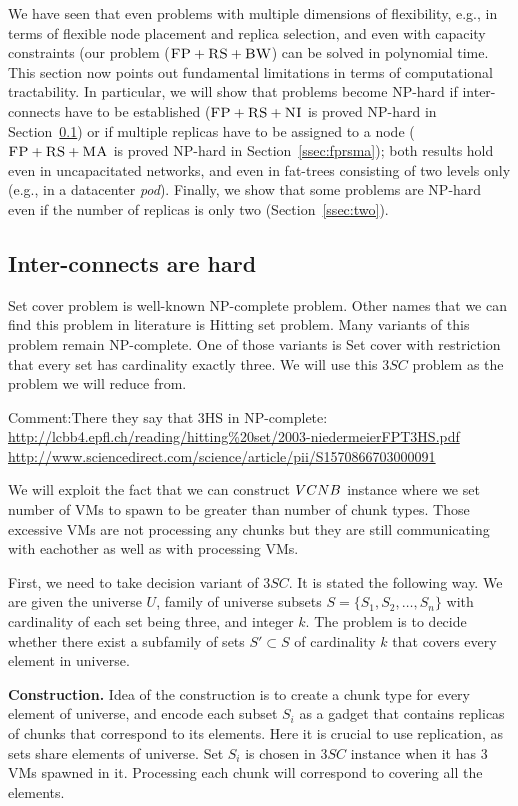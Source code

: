 We have seen that even problems with multiple dimensions of
flexibility, e.g., in terms of flexible node placement 
and replica selection, and even with capacity constraints (our problem
($\textsc{FP}+\textsc{RS}+\textsc{BW}$) can be solved in polynomial time.
This section now points out fundamental
limitations in terms of computational tractability. In particular,
we will show that problems become NP-hard if
inter-connects have to be established ($\textsc{FP}+\textsc{RS}+\textsc{NI}$ is proved
NP-hard in Section~\ref{ssec:fprscc}) or if multiple replicas
have to be assigned to a node ($\textsc{FP}+\textsc{RS}+\textsc{MA}$ is proved
NP-hard in Section~\ref{ssec:fprsma}); both results hold
even in uncapacitated networks, and even in fat-trees consisting
of two levels only (e.g., in a datacenter \emph{pod}). Finally, we show that
some problems are NP-hard even if the number of replicas is only two
(Section~\ref{ssec:two}).


\subsection{Inter-connects are hard}\label{ssec:fprscc}

Set cover problem is well-known NP-complete problem. Other names that
we can find this problem in literature is Hitting set problem. Many variants of
this problem remain NP-complete. One of those variants is Set cover
with restriction that every set has cardinality exactly three. We will
use this $3SC$ problem as the problem we will reduce from.

Comment:There they say that 3HS in NP-complete:
\url{http://lcbb4.epfl.ch/reading/hitting\%20set/2003-niedermeierFPT3HS.pdf}
\url{http://www.sciencedirect.com/science/article/pii/S1570866703000091}

We will exploit the fact that we can construct $VCNB$ instance where
we set number of VMs to spawn to be greater than number of chunk
types. Those excessive VMs are not processing any chunks but they are
still communicating with eachother as well as with processing
VMs.

First, we need to take decision variant of $3SC$. It is stated the
following way. We are given the universe $U$, family of universe
subsets $S = \{ S_1, S_2, \ldots, S_n \}$ with cardinality of each set
being three, and integer $k$. The problem is to decide whether there
exist a subfamily of sets $S' \subset S$ of cardinality $k$ that
covers every element in universe.

\textbf{Construction.}
Idea of the construction is to create a chunk type for every element
of universe, and encode each subset $S_i$ as a gadget that contains
replicas of chunks that correspond to its elements. Here it is crucial
to use replication, as sets share elements of universe. Set $S_i$ is
chosen in $3SC$ instance when it has $3$ VMs spawned in it. Processing
each chunk will correspond to covering all the elements.


